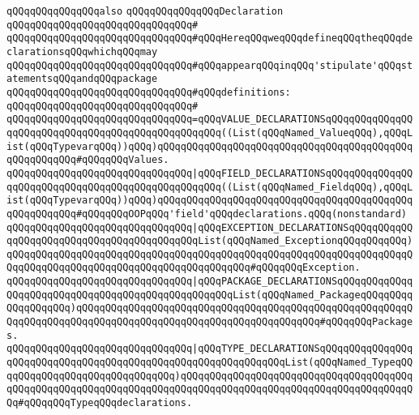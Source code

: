 \newline
\newline
\newline
\verb|qQQqqQQqqQQqqQQqalso|\newline
\verb|qQQqqQQqqQQqqQQqDeclaration|\newline
\verb|qQQqqQQqqQQqqQQqqQQqqQQqqQQqqQQq#|\newline
\verb|qQQqqQQqqQQqqQQqqQQqqQQqqQQqqQQq#qQQqHereqQQqweqQQqdefineqQQqtheqQQqdeclarationsqQQqwhichqQQqmay|\newline
\verb|qQQqqQQqqQQqqQQqqQQqqQQqqQQqqQQq#qQQqappearqQQqinqQQq'stipulate'qQQqstatementsqQQqandqQQqpackage|\newline
\verb|qQQqqQQqqQQqqQQqqQQqqQQqqQQqqQQq#qQQqdefinitions:|\newline
\verb|qQQqqQQqqQQqqQQqqQQqqQQqqQQqqQQq#|\newline
\verb|qQQqqQQqqQQqqQQqqQQqqQQqqQQqqQQq=qQQqVALUE_DECLARATIONSqQQqqQQqqQQqqQQqqQQqqQQqqQQqqQQqqQQqqQQqqQQqqQQqqQQq((List(qQQqNamed_ValueqQQq),qQQqList(qQQqTypevarqQQq))qQQq)qQQqqQQqqQQqqQQqqQQqqQQqqQQqqQQqqQQqqQQqqQQqqQQqqQQqqQQq#qQQqqQQqValues.|\newline
\verb|qQQqqQQqqQQqqQQqqQQqqQQqqQQqqQQq|\verb#|qQQqFIELD_DECLARATIONSqQQqqQQqqQQqqQQqqQQqqQQqqQQqqQQqqQQqqQQqqQQqqQQqqQQq((List(qQQqNamed_FieldqQQq),qQQqList(qQQqTypevarqQQq))qQQq)qQQqqQQqqQQqqQQqqQQqqQQqqQQqqQQqqQQqqQQqqQQqqQQqqQQqqQQq#\verb|#qQQqqQQqOOPqQQq'field'qQQqdeclarations.qQQq(nonstandard)|\newline
\verb|qQQqqQQqqQQqqQQqqQQqqQQqqQQqqQQq|\verb#|qQQqEXCEPTION_DECLARATIONSqQQqqQQqqQQqqQQqqQQqqQQqqQQqqQQqqQQqqQQqqQQqList(qQQqNamed_ExceptionqQQqqQQqqQQq)qQQqqQQqqQQqqQQqqQQqqQQqqQQqqQQqqQQqqQQqqQQqqQQqqQQqqQQqqQQqqQQqqQQqqQQqqQQqqQQqqQQqqQQqqQQqqQQqqQQqqQQqqQQqqQQq#\verb|#qQQqqQQqException.|\newline
\verb|qQQqqQQqqQQqqQQqqQQqqQQqqQQqqQQq|\verb#|qQQqPACKAGE_DECLARATIONSqQQqqQQqqQQqqQQqqQQqqQQqqQQqqQQqqQQqqQQqqQQqqQQqqQQqList(qQQqNamed_PackageqQQqqQQqqQQqqQQqqQQq)qQQqqQQqqQQqqQQqqQQqqQQqqQQqqQQqqQQqqQQqqQQqqQQqqQQqqQQqqQQqqQQqqQQqqQQqqQQqqQQqqQQqqQQqqQQqqQQqqQQqqQQqqQQqqQQq#\verb|#qQQqqQQqPackages.|\newline
\verb|qQQqqQQqqQQqqQQqqQQqqQQqqQQqqQQq|\verb#|qQQqTYPE_DECLARATIONSqQQqqQQqqQQqqQQqqQQqqQQqqQQqqQQqqQQqqQQqqQQqqQQqqQQqqQQqqQQqqQQqList(qQQqNamed_TypeqQQqqQQqqQQqqQQqqQQqqQQqqQQqqQQq)qQQqqQQqqQQqqQQqqQQqqQQqqQQqqQQqqQQqqQQqqQQqqQQqqQQqqQQqqQQqqQQqqQQqqQQqqQQqqQQqqQQqqQQqqQQqqQQqqQQqqQQqqQQqqQQq#\verb|#qQQqqQQqTypeqQQqdeclarations.|\newline
